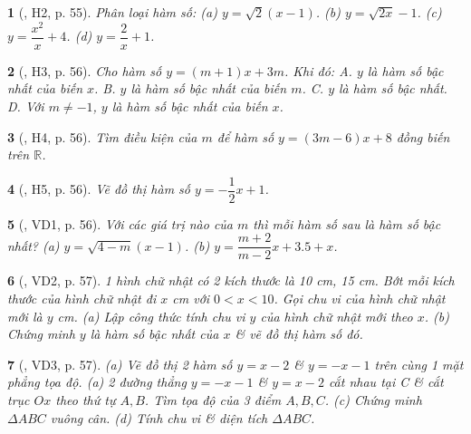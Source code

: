 \documentclass{article}
\newtheorem{baitoan}{}
\begin{document}
\begin{baitoan}[\cite{Binh_boi_duong_Toan_9_tap_1}, H2, p. 55]
	Phân loại hàm số: (a) $y = \sqrt{2}(x - 1)$. (b) $y = \sqrt{2x} - 1$. (c) $y = \dfrac{x^2}{x} + 4$. (d) $y = \dfrac{2}{x} + 1$.
\end{baitoan}

\begin{baitoan}[\cite{Binh_boi_duong_Toan_9_tap_1}, H3, p. 56]
	Cho hàm số $y = (m + 1)x + 3m$. Khi đó: {\sf A.} $y$ là hàm số bậc nhất của biến $x$. {\sf B.} $y$ là hàm số bậc nhất của biến $m$. {\sf C.} $y$ là hàm số bậc nhất. {\sf D.} Với $m\ne-1$, $y$ là hàm số bậc nhất của biến $x$.
\end{baitoan}

\begin{baitoan}[\cite{Binh_boi_duong_Toan_9_tap_1}, H4, p. 56]
	Tìm điều kiện của $m$ để hàm số $y = (3m - 6)x + 8$ đồng biến trên $\mathbb{R}$.
\end{baitoan}

\begin{baitoan}[\cite{Binh_boi_duong_Toan_9_tap_1}, H5, p. 56]
	Vẽ đồ thị hàm số $y = -\dfrac{1}{2}x + 1$.
\end{baitoan}

\begin{baitoan}[\cite{Binh_boi_duong_Toan_9_tap_1}, VD1, p. 56]
	Với các giá trị nào của $m$ thì mỗi hàm số sau là hàm số bậc nhất? (a) $y = \sqrt{4 - m}(x - 1)$. (b) $y = \dfrac{m + 2}{m - 2}x + 3.5 + x$.
\end{baitoan}

\begin{baitoan}[\cite{Binh_boi_duong_Toan_9_tap_1}, VD2, p. 57]
	1 hình chữ nhật có 2 kích thước là {\rm10 cm, 15 cm}. Bớt mỗi kích thước của hình chữ nhật đi $x$ {\rm cm} với $0 < x < 10$. Gọi chu vi của hình chữ nhật mới là $y$ {\rm cm}. (a) Lập công thức tính chu vi $y$ của hình chữ nhật mới theo $x$. (b) Chứng minh $y$ là hàm số bậc nhất của $x$ \& vẽ đồ thị hàm số đó.
\end{baitoan}

\begin{baitoan}[\cite{Binh_boi_duong_Toan_9_tap_1}, VD3, p. 57]
	(a) Vẽ đồ thị 2 hàm số $y = x - 2$ \& $y = -x - 1$ trên cùng 1 mặt phẳng tọa độ. (a) 2 đường thẳng $y = -x - 1$ \& $y = x - 2$ cắt nhau tại C \& cắt trục $Ox$ theo thứ tự $A,B$. Tìm tọa độ của 3 điểm $A,B,C$. (c) Chứng minh $\Delta ABC$ vuông cân. (d) Tính chu vi \& diện tích $\Delta ABC$.
\end{baitoan}
\end{document}
